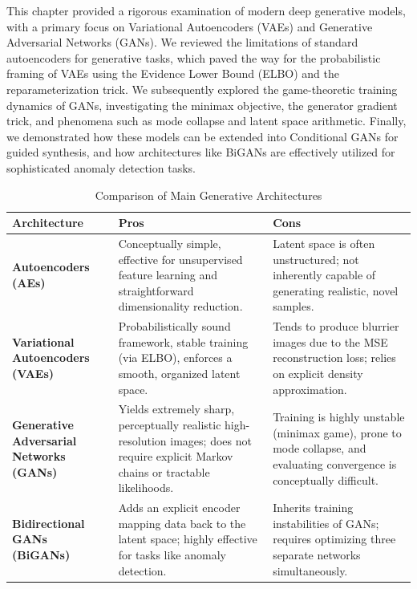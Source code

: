 This chapter provided a rigorous examination of modern deep generative models, with a primary focus on Variational Autoencoders (VAEs) and Generative Adversarial Networks (GANs). We reviewed the limitations of standard autoencoders for generative tasks, which paved the way for the probabilistic framing of VAEs using the Evidence Lower Bound (ELBO) and the reparameterization trick. We subsequently explored the game-theoretic training dynamics of GANs, investigating the minimax objective, the generator gradient trick, and phenomena such as mode collapse and latent space arithmetic. Finally, we demonstrated how these models can be extended into Conditional GANs for guided synthesis, and how architectures like BiGANs are effectively utilized for sophisticated anomaly detection tasks.

\begin{table}[h]
\centering
\begin{tabularx}{\textwidth}{| >{\centering\arraybackslash}m{3.5cm} | X | X |}
\hline
\textbf{Architecture} & \textbf{Pros} & \textbf{Cons} \\
\hline
\textbf{Autoencoders (AEs)} & Conceptually simple, effective for unsupervised feature learning and straightforward dimensionality reduction. & Latent space is often unstructured; not inherently capable of generating realistic, novel samples. \\
\hline
\textbf{Variational Autoencoders (VAEs)} & Probabilistically sound framework, stable training (via ELBO), enforces a smooth, organized latent space. & Tends to produce blurrier images due to the MSE reconstruction loss; relies on explicit density approximation. \\
\hline
\textbf{Generative Adversarial Networks (GANs)} & Yields extremely sharp, perceptually realistic high-resolution images; does not require explicit Markov chains or tractable likelihoods. & Training is highly unstable (minimax game), prone to mode collapse, and evaluating convergence is conceptually difficult. \\
\hline
\textbf{Bidirectional GANs (BiGANs)} & Adds an explicit encoder mapping data back to the latent space; highly effective for tasks like anomaly detection. & Inherits training instabilities of GANs; requires optimizing three separate networks simultaneously. \\
\hline
\end{tabularx}
\caption{Comparison of Main Generative Architectures}
\label{tab:gen_architectures}
\end{table}

